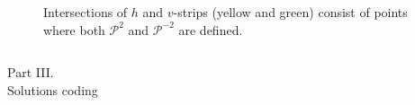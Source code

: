 \documentclass [10pt] {beamer}
\begin{document}
\begin{frame}
\begin{columns}[T]
\begin{column}{.5\textwidth}
\begin{figure}
			\caption{Intersections of $h$ and $v$-strips (yellow and green) consist of points where both $\mathcal{P}^2$ and $\mathcal{P}^{-2}$ are defined.}
			\label{pic:h-and-v-strips}
			\end{figure}
		\end{column}
	\end{columns}
\end{frame}

\begin{frame}
	\begin{center}
		{\Huge Part III.} \\[10pt] {\LARGE Solutions coding}
	\end{center}
\end{frame}

\end{document}
